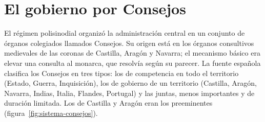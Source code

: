 \documentclass{book}
\begin{document}

\section{El gobierno por Consejos}

El régimen polisinodial organizó la administración central en un conjunto de órganos colegiados llamados Consejos. Su origen está en los órganos consultivos medievales de las coronas de Castilla, Aragón y Navarra; el mecanismo básico era elevar una consulta al monarca, que resolvía según su parecer. La fuente española clasifica los Consejos en tres tipos: los de competencia en todo el territorio (Estado, Guerra, Inquisición), los de gobierno de un territorio (Castilla, Aragón, Navarra, Indias, Italia, Flandes, Portugal) y las juntas, menos importantes y de duración limitada. Los de Castilla y Aragón eran los preeminentes (figura~\ref{fig:sistema-consejos}).

\end{document}
